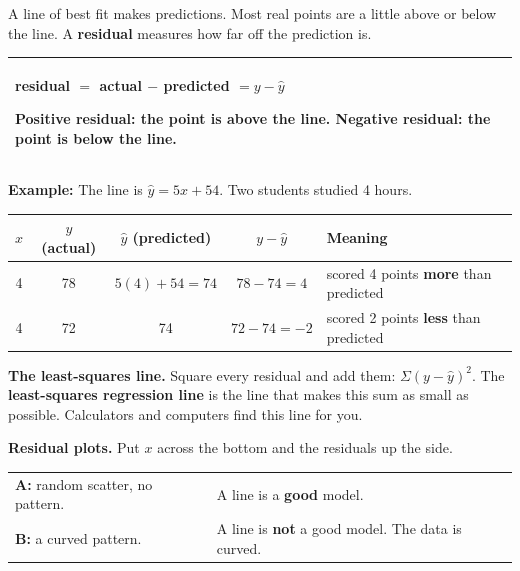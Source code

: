 \documentclass[11pt]{article}
\begin{document}

A line of best fit makes predictions. Most real points are a little above or below the line.
A \textbf{residual} measures how far off the prediction is.

\vspace{0.5em}
\begin{tabular}{|>{\raggedright\arraybackslash}p{6.7in}|}\hline
\textbf{residual} $=$ actual $-$ predicted $= y - \hat{y}$\par\vspace{0.2em}
Positive residual: the point is \textbf{above} the line. \qquad Negative residual: the point is \textbf{below} the line.\\ \hline
\end{tabular}

\begin{center}\end{center}

\textbf{Example:} The line is $\hat{y} = 5x + 54$. Two students studied 4 hours.

\vspace{0.3em}
\renewcommand{\arraystretch}{1.4}
\begin{tabular}{|c|c|c|c|l|}\hline
$x$ & $y$ (actual) & $\hat{y}$ (predicted) & $y - \hat{y}$ & Meaning\\ \hline
4 & 78 & $5(4) + 54 = 74$ & $78 - 74 = 4$ & scored 4 points \textbf{more} than predicted\\ \hline
4 & 72 & 74 & $72 - 74 = -2$ & scored 2 points \textbf{less} than predicted\\ \hline
\end{tabular}

\vspace{0.8em}
\textbf{The least-squares line.} Square every residual and add them: $\Sigma(y - \hat{y})^2$.
The \textbf{least-squares regression line} is the line that makes this sum as small as possible.
Calculators and computers find this line for you.

\vspace{0.8em}
\textbf{Residual plots.} Put $x$ across the bottom and the residuals up the side.

\begin{center}\end{center}

\begin{tabular}{@{}ll}
\textbf{A:} random scatter, no pattern. & A line is a \textbf{good} model.\\
\textbf{B:} a curved pattern. & A line is \textbf{not} a good model. The data is curved.\\
\end{tabular}
\end{document}
